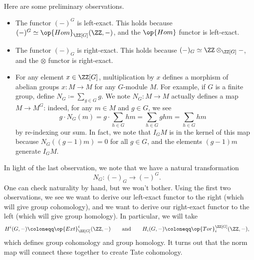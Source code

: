 \documentclass[../notes.tex]{subfiles}
\begin{document}
Here are some preliminary observations.
\begin{itemize}
	\item The functor $(-)^G$ is left-exact. This holds because $(-)^G\simeq\op{Hom}_{\ZZ[G]}(\ZZ,-)$, and the $\op{Hom}$ functor is left-exact.
	\item The functor $(-)_G$ is right-exact. This holds because $(-)_G\simeq\ZZ\otimes_{\ZZ[G]}-$, and the $\otimes$ functor is right-exact.
	\item For any element $x\in\ZZ[G]$, multiplication by $x$ defines a morphism of abelian groups $x\colon M\to M$ for any $G$-module $M$. For example, if $G$ is a finite group, define $N_G\coloneqq\sum_{g\in G}g$. We note $N_G\colon M\to M$ actually defines a map $M\to M^G$: indeed, for any $m\in M$ and $g\in G$, we see
	\[g\cdot N_G(m)=g\cdot\sum_{h\in G}hm=\sum_{h\in G}ghm=\sum_{h\in G}hm\]
	by re-indexing our sum. In fact, we note that $I_GM$ is in the kernel of this map because $N_G((g-1)m)=0$ for all $g\in G$, and the elements $(g-1)m$ generate $I_GM$.
\end{itemize}
In light of the last observation, we note that we have a natural transformation
\[N_G\colon(-)_G\to(-)^G.\]
One can check naturality by hand, but we won't bother. Using the first two observations, we see we want to derive our left-exact functor to the right (which will give group cohomology), and we want to derive our right-exact functor to the left (which will give group homology). In particular, we will take
\[H^i(G,-)\coloneqq\op{Ext}^i_{\ZZ[G]}(\ZZ,-)\qquad\text{and}\qquad H_i(G,-)\coloneqq\op{Tor}_i^{\ZZ[G]}(\ZZ,-),\]
which defines group cohomology and group homology. It turns out that the norm map will connect these together to create Tate cohomology.
\end{document}
